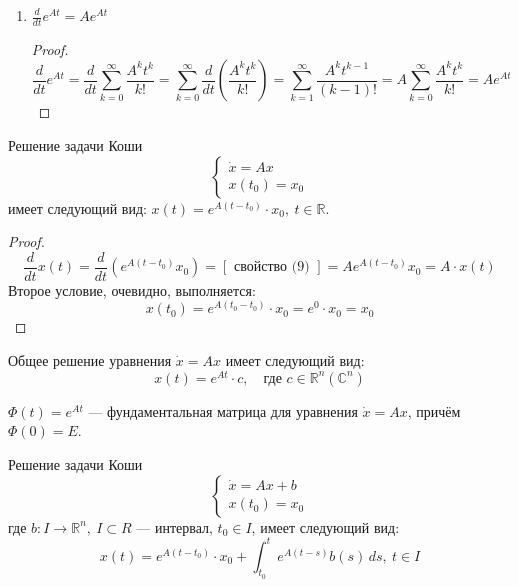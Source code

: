 \documentclass[11pt]{article}
\begin{document}
\begin{enumerate}
\begin{proof}
        Отсюда следует, что \[e^A v = \left(\sum_{k = 0}^{\infty} \frac{A^k}{k!}\right)v = \sum_{k = 0}^{\infty} \frac{A^k v}{k!} = \sum_{k = 0}^{\infty}
        \frac{\lambda^k v }{k!} = v \sum_{k = 0}^{\infty}\frac{\lambda^k}{k!} = e^\lambda v\]
    \end{proof}
    \item $\displaystyle \frac{d}{dt} e^{A t} = A e^{At}$
    \begin{proof}
        \[\frac{d}{dt} e^{At} = \frac{d}{dt} \sum_{k = 0}^{\infty } \frac{A^k t^k}{k!} = \sum_{k = 0}^{\infty} \frac{d}{dt} \left(\frac{A^k t^k}{k!}\right)
        = \sum_{k = 1}^{\infty} \frac{A^k t^{k-1}}{(k-1)!} = A \sum_{k = 0}^{\infty} \frac{A^k t^k}{k!} = A e^{At}\]
    \end{proof}
\end{enumerate}

\begin{theorem}
    Решение задачи Коши \[\left\{ \begin{array}{l}
        \dot{x} = Ax \\ x(t_0) = x_0
    \end{array}\right.\]
    имеет следующий вид: $x(t) = e^{A(t - t_0)} \cdot x_0, \ t \in \mathbb{R}$.
\end{theorem}

\begin{proof}
    \[\frac{d}{dt} x(t) = \frac{d}{dt}\left(e^{A(t - t_0)} x_0\right) = \left[\text{ свойство (9) }\right] = A e^{A(t - t_0)} x_0 = A \cdot x(t)\]
    Второе условие, очевидно, выполняется: \[x(t_0) = e^{A(t_0 - t_0)} \cdot x_0 = e^0 \cdot x_0 = x_0\]
\end{proof}

\begin{remark}
    Общее решение уравнения $\dot{x} = A x$ имеет следующий вид: \[x(t) = e^{A t} \cdot c, \quad \text{где } c \in \mathbb{R}^n \left(\mathbb{C}^n\right)\]
\end{remark}

\begin{remark}
    $\Phi(t) = e^{At}$ --- фундаментальная матрица для уравнения $\dot{x} = A x$, причём $\Phi(0) = E$.
\end{remark}

\begin{consequence}
    Решение задачи Коши \[\left\{ \begin{array}{l}
        \dot{x} = Ax + b \\ x(t_0) = x_0
    \end{array}\right.\]
    где $b: I \to \mathbb{R}^n, \ I \subset R$ --- интервал, $t_0 \in I$, имеет следующий вид: 
    \[x(t) = e^{A(t - t_0)} \cdot x_0 + \int_{t_0}^{t}e^{A(t-s)} b(s)  \,ds , \ t \in I\]
\end{consequence}
\end{document}
